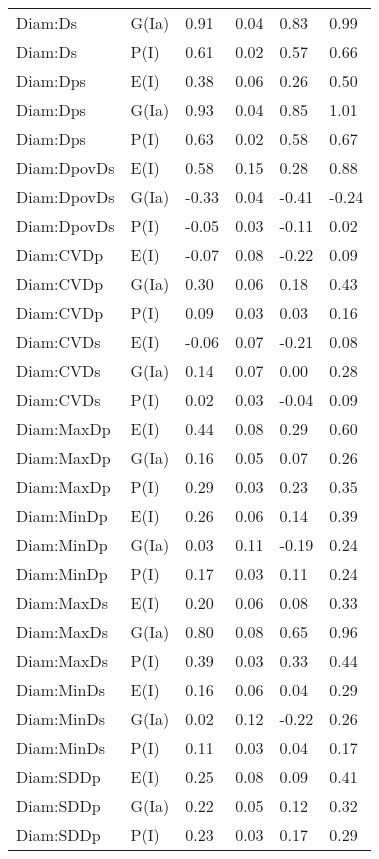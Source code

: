\begin{center}
\begin{longtable}{|p{1.1in}|p{0.7in}|p{0.7in}|p{0.6in}|p{0.6in}|p{0.6in}|}
  Diam:Ds & G(Ia) & 0.91 & 0.04 & 0.83 & 0.99 \\ 
  Diam:Ds & P(I) & 0.61 & 0.02 & 0.57 & 0.66 \\ 
  Diam:Dps & E(I) & 0.38 & 0.06 & 0.26 & 0.50 \\ 
  Diam:Dps & G(Ia) & 0.93 & 0.04 & 0.85 & 1.01 \\ 
  Diam:Dps & P(I) & 0.63 & 0.02 & 0.58 & 0.67 \\ 
  Diam:DpovDs & E(I) & 0.58 & 0.15 & 0.28 & 0.88 \\ 
  Diam:DpovDs & G(Ia) & -0.33 & 0.04 & -0.41 & -0.24 \\ 
  Diam:DpovDs & P(I) & -0.05 & 0.03 & -0.11 & 0.02 \\ 
  Diam:CVDp & E(I) & -0.07 & 0.08 & -0.22 & 0.09 \\ 
  Diam:CVDp & G(Ia) & 0.30 & 0.06 & 0.18 & 0.43 \\ 
  Diam:CVDp & P(I) & 0.09 & 0.03 & 0.03 & 0.16 \\ 
  Diam:CVDs & E(I) & -0.06 & 0.07 & -0.21 & 0.08 \\ 
  Diam:CVDs & G(Ia) & 0.14 & 0.07 & 0.00 & 0.28 \\ 
  Diam:CVDs & P(I) & 0.02 & 0.03 & -0.04 & 0.09 \\ 
  Diam:MaxDp & E(I) & 0.44 & 0.08 & 0.29 & 0.60 \\ 
  Diam:MaxDp & G(Ia) & 0.16 & 0.05 & 0.07 & 0.26 \\ 
  Diam:MaxDp & P(I) & 0.29 & 0.03 & 0.23 & 0.35 \\ 
  Diam:MinDp & E(I) & 0.26 & 0.06 & 0.14 & 0.39 \\ 
  Diam:MinDp & G(Ia) & 0.03 & 0.11 & -0.19 & 0.24 \\ 
  Diam:MinDp & P(I) & 0.17 & 0.03 & 0.11 & 0.24 \\ 
  Diam:MaxDs & E(I) & 0.20 & 0.06 & 0.08 & 0.33 \\ 
  Diam:MaxDs & G(Ia) & 0.80 & 0.08 & 0.65 & 0.96 \\ 
  Diam:MaxDs & P(I) & 0.39 & 0.03 & 0.33 & 0.44 \\ 
  Diam:MinDs & E(I) & 0.16 & 0.06 & 0.04 & 0.29 \\ 
  Diam:MinDs & G(Ia) & 0.02 & 0.12 & -0.22 & 0.26 \\ 
  Diam:MinDs & P(I) & 0.11 & 0.03 & 0.04 & 0.17 \\ 
  Diam:SDDp & E(I) & 0.25 & 0.08 & 0.09 & 0.41 \\ 
  Diam:SDDp & G(Ia) & 0.22 & 0.05 & 0.12 & 0.32 \\ 
  Diam:SDDp & P(I) & 0.23 & 0.03 & 0.17 & 0.29 \\ 

\end{longtable}
\end{center}
